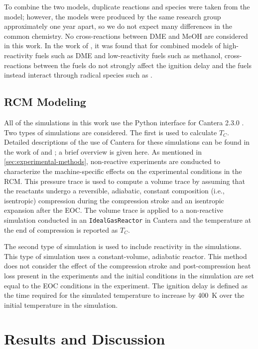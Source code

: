 \documentclass[12pt]{../ussci}
\begin{document}
To combine the two models, duplicate reactions and species were taken from the
\textcite{Burke2015a} model; however, the models were produced by the same
research group approximately one year apart, so we do not expect many
differences in the common chemistry. No cross-reactions between DME and MeOH
are considered in this work. In the work of \textcite{Dames2016}, it was found
that for combined models of high-reactivity fuels such as DME and low-reactivity
fuels such as methanol, cross-reactions between the fuels do not strongly affect
the ignition delay and the fuels instead interact through radical species such
as .

\subsection{RCM Modeling}\label{sec:rcm-modeling}

All of the simulations in this work use the Python interface for Cantera 2.3.0
\autocite{cantera}. Two types of simulations are considered. The first is used
to calculate \(T_C\). Detailed descriptions of the use of Cantera for these
simulations can be found in the work of \textcite{Weber2016a} and
\textcite{Dames2016}; a brief overview is given here. As mentioned in
\cref{sec:experimental-methods}, non-reactive experiments are conducted to
characterize the machine-specific effects on the experimental conditions in the
RCM. This pressure trace is used to compute a volume trace by assuming that the
reactants undergo a reversible, adiabatic, constant composition (i.e.,
isentropic) compression during the compression stroke and an isentropic
expansion after the EOC. The volume trace is applied to a non-reactive
simulation conducted in an \verb|IdealGasReactor| in Cantera \autocite{cantera}
and the temperature at the end of compression is reported as \(T_C\).

The second type of simulation is used to include reactivity in the simulations.
This type of simulation uses a constant-volume, adiabatic reactor. This method
does not consider the effect of the compression stroke and post-compression heat
loss present in the experiments and the initial conditions in the simulation are
set equal to the EOC conditions in the experiment. The ignition delay is defined
as the time required for the simulated temperature to increase by \SI{400}{\K}
over the initial temperature in the simulation.

\section{Results and Discussion}\label{sec:results-and-discussion}
\end{document}

